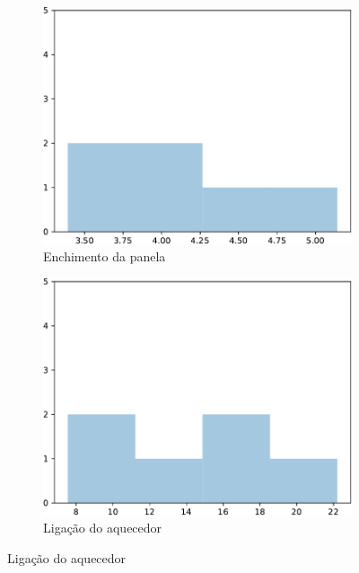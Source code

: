 \documentclass[12pt]{article}
\begin{document}
\begin{figure}[h]
    \centering
    
    \begin{subfigure}[b]{0.33\textwidth}%
         \centering
         \includegraphics[width=\textwidth]{figuras/enchimento_panela}
         \caption{Enchimento da panela}
         \label{fig:hist_enchimento_panela}
     \end{subfigure}%
     \hfill
     \begin{subfigure}[b]{0.33\textwidth}%
         \centering
         \includegraphics[width=\textwidth]{figuras/ligação_aquecedor}
         \caption{Ligação do aquecedor}
         \label{fig:hist_ligacao_aquecedor}

\end{subfigure}
\end{figure}
\end{document}

